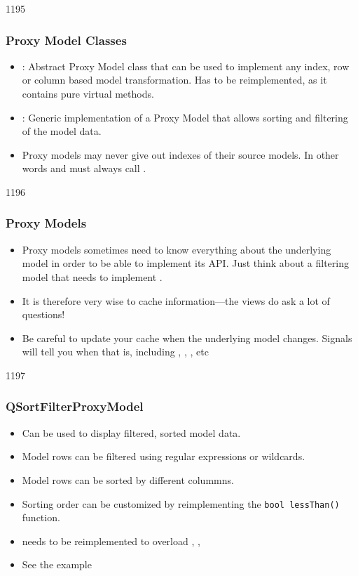 \begin{slide}[fragile]{1195}\frametitle{Proxy Model Classes}
  \begin{itemize}
  \item {}: Abstract Proxy Model class that can be used to
    implement any index, row or column based model transformation. Has to be
    reimplemented, as it contains pure virtual methods.
  \item {}: Generic implementation of a Proxy Model that
    allows sorting and filtering of the model data. 
  \item Proxy models may never give out indexes of their source models. In
    other words  and  must always call .
  \end{itemize}
\end{slide}

\begin{slide}{1196}\frametitle{Proxy Models}
\begin{itemize}
\item Proxy models sometimes need to know everything about the underlying
  model in order to be able to implement its API. Just think about a filtering model
  that needs to implement .
\item It is therefore very wise to cache information---the views do ask a
  lot of questions!
\item Be careful to update your cache when the underlying model
  changes. Signals will tell you when that is, including
  ,
  ,
  , etc
\end{itemize}
\end{slide}


\begin{slide}[fragile]{1197}\frametitle{QSortFilterProxyModel}
  \begin{itemize}
  \item Can be used to display filtered, sorted model data.
  \item Model rows can be filtered using regular expressions or wildcards. 
  \item Model rows can be sorted by different colummns. 
  \item Sorting order can be customized by reimplementing the \texttt{bool lessThan()}
    function. 
  \item needs to be reimplemented to overload ,
    , 
  \item See the example
  \end{itemize}
\end{slide}


